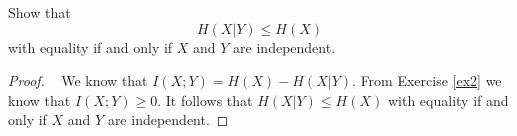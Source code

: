 \begin{exercise}  {Show that $$H(X|Y) \le H(X)$$
  with equality if and only if $X$ and $Y$ are independent. }
\begin{proof}
\par{~}
We know that $I(X;Y) = H(X) - H(X|Y)$. From Exercise \ref{ex2} we know that $I(X;Y) \ge 0$. It follows that $H(X|Y) \le H(X)$ with equality if and only if $X$ and $Y$ are independent.
\end{proof}
\end{exercise}
  